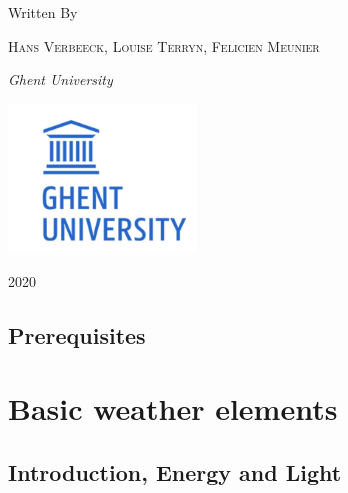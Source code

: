 \documentclass[12pt,oneside]{book}
\begin{document}
\begin{titlepage}
	Written By
	
	\vspace{0.5\baselineskip} %
	
	{\scshape Hans Verbeeck, Louise Terryn, Felicien Meunier \\} %
	
	\vspace{0.5\baselineskip} %
	
	\textit{Ghent University \\} %
	
	\vfill %
	
	
	
	\includegraphics[width = 50mm]{figures/UGhent2.png}
	
	\vspace{0.3\baselineskip} %
	
	2020 %
	

\end{titlepage}

{
\setcounter{tocdepth}{1}
\tableofcontents
}
\chapter*{Prerequisites}\label{prerequisites}

\mainmatter

\part{Basic weather
elements}\label{part-basic-weather-elements}

\chapter{Introduction, Energy and Light}\label{intro}
\end{document}
